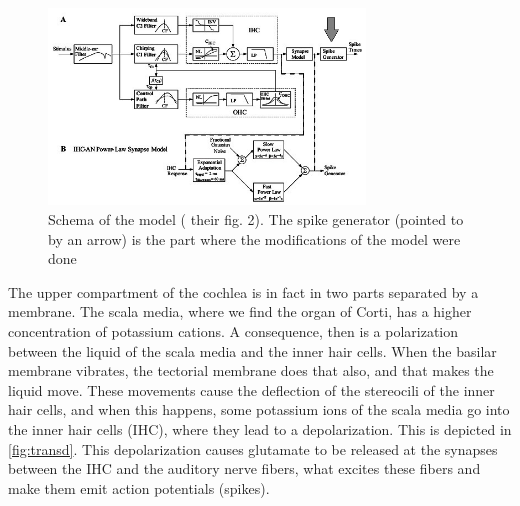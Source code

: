 \begin{figure}[ht]
	\centering
  \includegraphics[width=0.75\textwidth]{images/www-bme-rochester-edu-schematicDiagram-level.jpg}
	\caption{Schema of the model (\cite{Model1} their fig. 2). 
	The spike generator (pointed to by an arrow) is 
	the part where the modifications of the model were done}
	\label{fig:modelsch}
\end{figure}

The upper compartment of the cochlea is in fact in two parts separated by a membrane.
The scala media, where we find the organ of Corti, has a higher 
concentration of potassium cations. A consequence, then is a polarization between
the liquid of the scala media and the inner hair cells. 
When the basilar membrane vibrates, the tectorial membrane does 
that also, and that makes the liquid move. 
These movements cause the deflection of the stereocili 
of the inner hair cells, and when this happens, some potassium ions of the 
scala media go into the inner hair cells (IHC), where they lead to a depolarization.
This is depicted in \autoref{fig:transd}.
This depolarization causes glutamate to be released at the synapses %
between the IHC and the auditory nerve fibers, what excites these fibers 
and make them emit action potentials (spikes).




